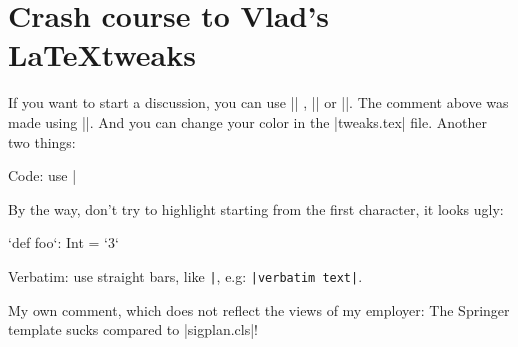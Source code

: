 \section*{Crash course to Vlad's \LaTeX tweaks}

 If you want to start a discussion, you can use || , || or ||. The comment above was made using ||. And you can change your color in the |tweaks.tex| file. Another two things:

\vspace{0.5em}

\noindent Code: use |

\noindent By the way, don't try to highlight starting from the first character, it looks ugly:

\begin{lstlisting-nobreak}
  `def foo`: Int = `3`
\end{lstlisting-nobreak}

\noindent Verbatim: use straight bars, like \verb=|=, e.g: \verb=|verbatim text|=.

My own comment, which does not reflect the views of my employer: The Springer template sucks compared to |sigplan.cls|!